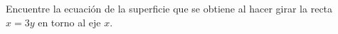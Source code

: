 \item Encuentre la ecuación de la superficie que se obtiene al hacer girar la recta $x = 3y$ en torno al eje $x$.

